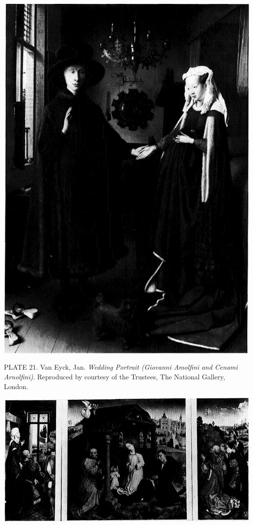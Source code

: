 \protect\hypertarget{20_ILLUSTRATIONS_FOLLOW_PAGE.xhtmlux5cux23id_20}{}{}\includegraphics{include/html/images/340_1.png}

PLATE 21. Van Eyck, Jan. \emph{Wedding Portrait (Giovanni Amolfini and
Cenami Arnolfini)}. Reproduced by courtesy of the Trustees, The National
Gallery, London.

\protect\hypertarget{20_ILLUSTRATIONS_FOLLOW_PAGE.xhtmlux5cux23id_21}{}{}\includegraphics{include/html/images/341_1.png}

